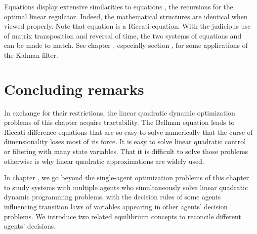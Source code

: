 Equations
  display extensive similarities to equations
 , the recursions for the optimal
linear regulator.  Indeed, the mathematical structures are identical when viewed properly.
Note that equation  is
a Riccati equation.   With the judicious use
of matrix transposition and reversal of time, the two systems of equations
 and 
can be made to match. %
See chapter , especially section , for some applications of the Kalman filter.
%
%




\section{Concluding remarks}

In exchange for their restrictions,
 the linear quadratic dynamic optimization problems of
this chapter acquire  tractability.     The Bellman
equation leads to Riccati difference  equations that
are so  easy to solve numerically that the curse of
dimensionality loses most of its force.  It is easy
to solve linear quadratic control or filtering with many state variables.
That it is difficult to solve  those problems otherwise is why
linear quadratic approximations are widely used.

  In chapter , we go beyond the single-agent optimization
problems of this chapter  to study
systems with multiple  agents who simultaneously solve
linear quadratic dynamic programming problems, with the decision rules of some agents influencing transition
   laws of variables appearing in other agents' decision problems.  We introduce two related equilibrium concepts
   to reconcile different agents' decisions.


